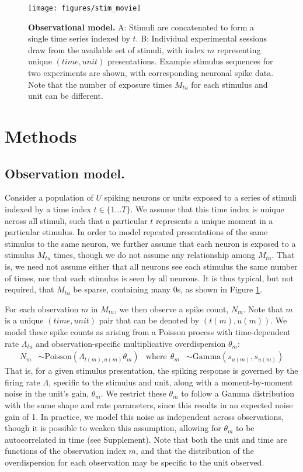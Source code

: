 \documentclass{nature}
\begin{document}
\begin{figure}
   \texttt{[image: figures/stim\_movie]} %
   \caption{\textbf{Observational model.} A: Stimuli are concatenated to form a single time series indexed by $t$. B: Individual experimental sessions draw from the available set of stimuli, with index $m$ representing unique $(time, unit)$ presentations. Example stimulus sequences for two experiments are shown, with corresponding neuronal spike data. Note that the number of exposure times $M_{tu}$ for each stimulus and unit can be different.}
   \label{fig:movie}
\end{figure}

\section*{Methods}
\label{model_sec}

\subsection{Observation model.}
Consider a population of $U$ spiking neurons or units exposed to a series of stimuli indexed by a time index $t\in \lbrace 1\ldots T\rbrace$. We assume that this time index is unique across all stimuli, such that a particular $t$ represents a unique moment in a particular stimulus. In order to model repeated presentations of the same stimulus to the same neuron, we further assume that each neuron is exposed to a stimulus $M_{tu}$ times, though we do not assume any relationship among $M_{tu}$. That is, we need not assume either that all neurons see each stimulus the same number of times, nor that each stimulus is seen by all neurons. It is thus typical, but not required, that $M_{tu}$ be sparse, containing many 0s, as shown in Figure \ref{fig:movie}.

For each observation $m$ in $M_{tu}$, we then observe a spike count, $N_m$. Note that $m$ is a unique $(time, unit)$ pair that can be denoted by $(t(m), u(m))$. We model these spike counts as arising from a Poisson process with time-dependent rate $\Lambda_{tu}$ and observation-specific multiplicative overdispersion $\theta_m$:
\begin{align}
    \label{obs_model}
    N_{m} &\sim \text{Poisson}(\Lambda_{t(m), u(m)} \theta_m) &
    \text{where} ~~ \theta_m &\sim \text{Gamma}(s_{u(m)}, s_{u(m)})
\end{align}
That is, for a given stimulus presentation, the spiking response is governed by the firing rate $\Lambda$, specific to the stimulus and unit, along with a moment-by-moment noise in the unit's gain, $\theta_m$. We restrict these $\theta_m$ to follow a Gamma distribution with the same shape and rate parameters, since this results in an expected noise gain of 1. In practice, we model this noise as independent across observations, though it is possible to weaken this assumption, allowing for $\theta_m$ to be autocorrelated in time (see Supplement). Note that both the unit and time are functions of the observation index $m$, and that the distribution of the overdispersion for each observation may be specific to the unit observed.
\end{document}
